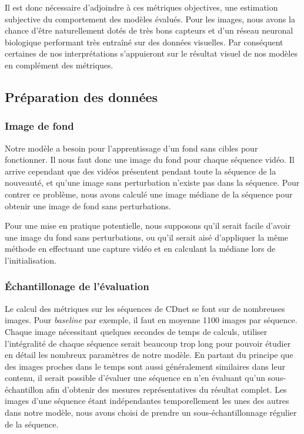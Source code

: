 	Il est donc nécessaire d'adjoindre à ces métriques objectives, une estimation subjective du comportement des modèles évalués. Pour les images, nous avons la chance d'être naturellement dotés de très bons capteurs et d'un réseau neuronal biologique performant très entraîné sur des données visuelles. Par conséquent certaines de nos interprétations s'appuieront sur le résultat visuel de nos modèles en complément des métriques.

	\subsection{Préparation des données}

	\subsubsection{Image de fond}

	Notre modèle a besoin pour l'apprentissage d'un fond sans cibles pour fonctionner. Il nous faut donc une image du fond pour chaque séquence vidéo. Il arrive cependant que des vidéos présentent pendant toute la séquence de la nouveauté, et qu'une image sans perturbation n'existe pas dans la séquence. Pour contrer ce problème, nous avons calculé une image médiane de la séquence pour obtenir une image de fond sans perturbations.

	Pour une mise en pratique potentielle, nous supposons qu'il serait facile d'avoir une image du fond sans perturbations, ou qu'il serait aisé d'appliquer la même méthode en effectuant une capture vidéo et en calculant la médiane lors de l'initialisation.
	
	\subsubsection{Échantillonage de l'évaluation}

	Le calcul des métriques sur les séquences de CDnet se font sur de nombreuses images. Pour \textit{baseline} par exemple, il faut en moyenne 1100 images par séquence. Chaque image nécessitant quelques secondes de temps de calculs, utiliser l'intégralité de chaque séquence serait beaucoup trop long pour pouvoir étudier en détail les nombreux paramètres de notre modèle. En partant du principe que des images proches dans le temps sont aussi généralement similaires dans leur contenu, il serait possible d'évaluer une séquence en n'en évaluant qu'un sous-échantillon afin d'obtenir des mesures représentatives du résultat complet. Les images d'une séquence étant indépendantes temporellement les unes des autres dans notre modèle, nous avons choisi de prendre un sous-échantillonnage régulier de la séquence.
	
